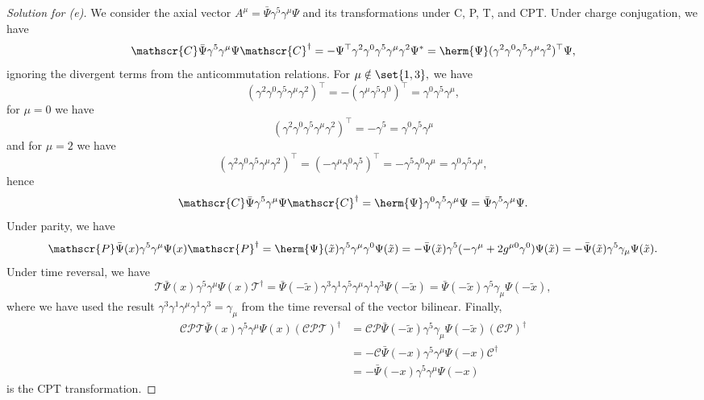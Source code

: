 \begin{proof}[Solution for (e)]
   We consider the axial vector \(A^\mu = \bar{\Psi} \gamma^5 \gamma^\mu\Psi\) and its transformations under C, P, T, and CPT. Under charge conjugation, we have
   \begin{equation*}
      \mathscr{C} \bar{\Psi} \gamma^5 \gamma^\mu \Psi \mathscr{C}^\dag = -\Psi^\top \gamma^2 \gamma^0 \gamma^5 \gamma^\mu \gamma^2 \Psi^* = \herm{\Psi} (\gamma^2 \gamma^0 \gamma^5 \gamma^\mu \gamma^2)^\top \Psi,
   \end{equation*}
   ignoring the divergent terms from the anticommutation relations. For \(\mu \notin \set{1,3},\) we have 
   \begin{equation*}
      (\gamma^2 \gamma^0 \gamma^5 \gamma^\mu \gamma^2)^\top = -(\gamma^\mu \gamma^5 \gamma^0)^\top = \gamma^0 \gamma^5 \gamma^\mu,
   \end{equation*}
   for \(\mu = 0\) we have
   \begin{equation*}
      (\gamma^2 \gamma^0 \gamma^5 \gamma^\mu \gamma^2)^\top = - \gamma^5 = \gamma^0 \gamma^5 \gamma^\mu
   \end{equation*}
   and for \(\mu = 2\) we have
   \begin{equation*}
       (\gamma^2 \gamma^0 \gamma^5 \gamma^\mu \gamma^2)^\top  = (- \gamma^\mu \gamma^0 \gamma^5)^\top = - \gamma^5 \gamma^0 \gamma^\mu = \gamma^0 \gamma^5 \gamma^\mu,
   \end{equation*}
   hence
   \begin{equation*}
      \mathscr{C} \bar{\Psi} \gamma^5 \gamma^\mu \Psi \mathscr{C}^\dag = \herm{\Psi} \gamma^0 \gamma^5 \gamma^\mu \Psi = \bar{\Psi} \gamma^5 \gamma^\mu \Psi.
   \end{equation*}
   Under parity, we have
   \begin{equation*}
      \mathscr{P} \bar{\Psi}(x) \gamma^5 \gamma^\mu \Psi(x) \mathscr{P}^\dag = \herm{\Psi}(\tilde{x}) \gamma^5 \gamma^\mu \gamma^0 \Psi(\tilde{x}) = -\bar{\Psi}(\tilde{x}) \gamma^5 (- \gamma^\mu + 2g^{\mu 0} \gamma^0) \Psi(\tilde{x}) = - \bar{\Psi}(\tilde{x}) \gamma^5 \gamma_\mu \Psi(\tilde{x}).
   \end{equation*}
   Under time reversal, we have
   \begin{equation*}
      \mathscr{T} \bar{\Psi}(x) \gamma^5 \gamma^\mu \Psi(x) \mathscr{T}^\dag = \bar{\Psi}(- \tilde{x}) \gamma^3 \gamma^1 \gamma^5 \gamma^\mu \gamma^1 \gamma^3 \Psi(- \tilde{x}) = \bar{\Psi}(- \tilde{x}) \gamma^5 \gamma_\mu \Psi(- \tilde{x}),
   \end{equation*}
   where we have used the result \(\gamma^3 \gamma^1 \gamma^\mu \gamma^1 \gamma^3 = \gamma_\mu\) from the time reversal of the vector bilinear. Finally,
   \begin{align*}
      \mathscr{CPT} \bar{\Psi}(x)\gamma^5\gamma^\mu\Psi(x) (\mathscr{CPT})^\dag 
       &= \mathscr{CP} \bar{\Psi}(-\tilde{x}) \gamma^5 \gamma_\mu\Psi(-\tilde{x}) (\mathscr{CP})^{\dag}\\
       &= -\mathscr{C}\bar{\Psi}(-x)\gamma^5 \gamma^\mu\Psi(-x) \mathscr{C}^\dag\\
       &= -\bar{\Psi}(-x) \gamma^5 \gamma^\mu\Psi(-x)
   \end{align*}
   is the CPT transformation.
\end{proof}
